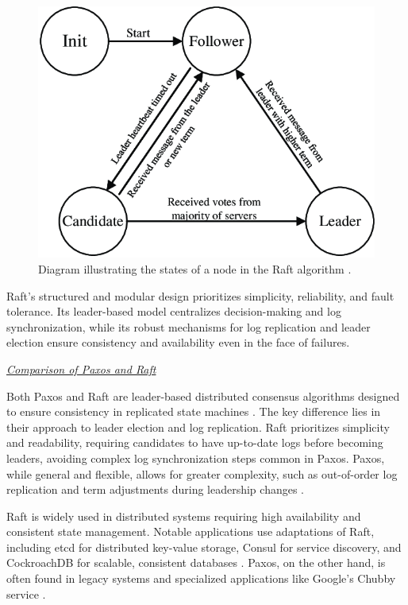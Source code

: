 \begin{figure}
    \centering
    \includegraphics[scale=1]{ch-background/assets/state-raft.png}
    \caption[Diagram illustrating the states of a node in the Raft algorithm]{Diagram illustrating the states of a node in the Raft algorithm \footnotemark.}
    \label{fig:state-raft}
\end{figure}

Raft’s structured and modular design prioritizes simplicity, reliability, and fault tolerance. Its leader-based model centralizes decision-making and log synchronization, while its robust mechanisms for log replication and leader election ensure consistency and availability even in the face of failures.

\textit{\underline{Comparison of Paxos and Raft}}

Both Paxos and Raft are leader-based distributed consensus algorithms designed to ensure consistency in replicated state machines \cite{Howard2020}. The key difference lies in their approach to leader election and log replication. Raft prioritizes simplicity and readability, requiring candidates to have up-to-date logs before becoming leaders, avoiding complex log synchronization steps common in Paxos. Paxos, while general and flexible, allows for greater complexity, such as out-of-order log replication and term adjustments during leadership changes \cite{Tanenbaum2023}.

Raft is widely used in distributed systems requiring high availability and consistent state management. Notable applications use adaptations of Raft, including etcd for distributed key-value storage, Consul for service discovery, and CockroachDB for scalable, consistent databases \cite{Howard2020,Vitillo2021}. Paxos, on the other hand, is often found in legacy systems and specialized applications like Google’s Chubby service \cite{Howard2020}.

